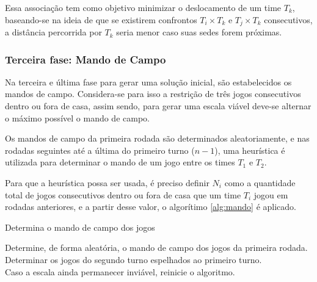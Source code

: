 \documentclass[12pt,a4paper]{article}
\makeatletter
\newcommand{\algorithmfootnote}[2][\footnotesize]{%
	\let\old@algocf@finish\@algocf@finish%
	\def\@algocf@finish{\old@algocf@finish%
		\leavevmode\rlap{\begin{minipage}{\linewidth}
				#1#2
		\end{minipage}}%
	}%
}
\makeatother
\begin{document}
Essa associação tem como objetivo minimizar o deslocamento de um time $T_{k}$, baseando-se na ideia de que se existirem confrontos $T_{i} \times T_{k}$ e $T_{j} \times T_{k}$ consecutivos, a distância percorrida por $T_{k}$ seria menor caso suas sedes forem próximas.

\subsubsection{Terceira fase: Mando de Campo}

Na terceira e última fase para gerar uma solução inicial, são estabelecidos os mandos de campo. Considera-se para isso a restrição de três jogos consecutivos dentro ou fora de casa, assim sendo, para gerar uma escala viável deve-se alternar o máximo possível o mando de campo.

Os mandos de campo da primeira rodada são determinados aleatoriamente, e nas rodadas seguintes até a última do primeiro turno ($n-1$), uma heurística é utilizada para determinar o mando de um jogo entre os times $T_{1}$ e $T_{2}$.

Para que a heurística possa ser usada, é preciso definir $N_{i}$ como a quantidade total de jogos consecutivos dentro ou fora de casa que um time $T_{i}$ jogou em rodadas anteriores, e a partir desse valor, o algorítimo \ref{alg:mando} é aplicado.

\begin{algorithm}[H]
	\caption{Determina o mando de campo dos jogos}
	\algorithmfootnote{Fonte: \Citeauthor{marcio:jogos} \Citep{marcio:jogos}}
	\label{alg:mando}
	Determine, de forma aleatória, o mando de campo dos jogos da primeira rodada.\\
	Determinar os jogos do segundo turno espelhados ao primeiro turno.\\
	Caso a escala ainda permanecer inviável, reinicie o algoritmo.
\end{algorithm}
\end{document}
